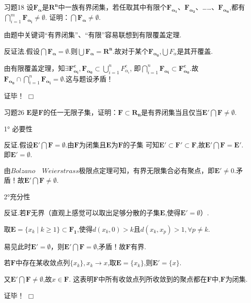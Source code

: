 \documentclass[11pt, a4paper, twoside]{ctexbook}
\newenvironment{proof2}{{\noindent\heiti 证明}}{\hfill $\Box $\par}
\begin{document}
	\begin{myproposition}{习题18}{}
		设$\mathbf{F_{\alpha}}$是$\mathbf{R^{n}}$中一族有界闭集，若任取其中有限个$\mathbf{F_{\alpha_{1}}}$、$\mathbf{F_{\alpha_{2}}}$、……、$\mathbf{F_{\alpha_{n}}}$,都有$\displaystyle \bigcap_{i=1}^{m} {\mathbf{F_{\alpha_{i}}}}\neq \emptyset.$
		证明：$\bigcap{\mathbf{F_{\alpha}}}\neq \emptyset$.
	\end{myproposition}
    \begin{proof2}
		由题中关键词“有界闭集”、“有限”容易联想到有限覆盖定理.

		反证法.假设$\bigcap{\mathbf{F_{\alpha}}} = \emptyset$.则$\bigcup \mathbf{F_{\alpha}}=\mathbf{R^{n}}$.故对于某个$\mathbf{F_{\alpha _{0}}}$,$\bigcup F_{\alpha}$是其开覆盖.

		由有限覆盖定理，知$\exists \mathbf{F_{\alpha_{i}}^{c}},\displaystyle\mathbf{F_{\alpha _{0}}} \subset \bigcup_{i=1}^{n}F_{\alpha_{i}}^{c}$, 
		即$\displaystyle\bigcap_{i=1}^{n}\mathbf{F_{\alpha_{i}}}\subset \mathbf{F_{\alpha_{0}}^{c}}.$故$\mathbf{F_{\alpha _{0}}} \cap  \displaystyle \bigcap_{i=1}^{n}\mathbf{F_{\alpha_{i}}}=\emptyset$.这与题设矛盾！

		证毕！
	\end{proof2}


	\begin{myproposition}{习题26}{}
		$\mathbf{E}$是$\mathbf{F}$的任一无限子集，证明：$\mathbf{F}\subset\mathbf{R_{n}}$是有界闭集当且仅当$\mathbf{E'}\bigcap\mathbf{F}\neq \emptyset$.
	\end{myproposition}
    \begin{proof2}
        1° 必要性

		反证.假设$\mathbf{E'}\bigcap\mathbf{F}=\emptyset$.由$\mathbf{F}$为闭集且$\mathbf{E}$为$\mathbf{F}$的子集
		可知$\mathbf{E'}\subset\mathbf{F'}\subset\mathbf{F}$,故$\mathbf{E'}\bigcap\mathbf{F}=\mathbf{E'}$.即$\mathbf{E'}=\emptyset$.

		由$Bolzano\quad Weierstrass$极限点定理可知，有界无限集合必有聚点，即$\mathbf{E'} \neq 0$.矛盾！故$\mathbf{E'}\bigcap\mathbf{F}\neq \emptyset$.

		2°充分性

		反证.若$\mathbf{F}$无界（直观上感觉可以取出足够分散的子集$\mathbf{E}$,使得$\mathbf{E'}=\emptyset$）.
		
		取$\mathbf{E}=\{x_{k}\mid k\geq 1\} \subset \mathbf{F_{1}}$,使得$d(x_{k},0)>k$且$d(x_{k},x_{p})>1,\forall p\neq k$.

		易见此时$\mathbf{E'}=\emptyset$，则$\mathbf{E'}\bigcap\mathbf{F}=\emptyset$,矛盾！故$\mathbf{F}$有界.

		若$\mathbf{F}$中存在某收敛点列$\{x_{k}\},x_{k}\to x$,取$\mathbf{E}=\{x_{k}\}$,则$\mathbf{E'}=\{x\}$.

		又$\mathbf{E'}\bigcap\mathbf{F}\neq \emptyset$,故$x\in\mathbf{F}$.
	    这表明$\mathbf{F}$中所有收敛点列所收敛到的聚点都在$\mathbf{F}$中,$\mathbf{F}$为闭集.

		证毕！
	\end{proof2}
\end{document}

